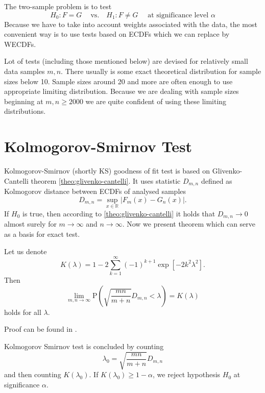 
The two-sample problem is to test
\begin{equation}
H_0: F = G \quad\: \text{vs.}\quad H_1: F \neq G \quad\text{ at significance level } \alpha
\end{equation} 
Because we have to take into account weights associated with the data, the most convenient way is to use tests based on ECDFs which we can replace by WECDFs. 

Lot of tests (including those mentioned below) are devised for relatively small data samples $m,n$. There usually is some exact theoretical distribution for sample sizes below 10. Sample sizes around 20 and more are often enough to use appropriate limiting distribution. Because we are dealing with sample sizes beginning at $m,n \geq 2000$ we are quite confident of using these limiting distributions.

\section{Kolmogorov-Smirnov Test}
Kolmogorov-Smirnov (shortly KS) goodness of fit test is based on Glivenko-Cantelli theorem \ref{theo:glivenko-cantelli}. It uses statistic $D_{m,n}$ defined as Kolmogorov distance between ECDFs of analysed samples
\begin{equation}
D_{m,n} = \sup_{x \in \mathbb{R}} |F_m(x) - G_n(x)|.
\end{equation}
If $H_0$ is true, then according to \ref{theo:glivenko-cantelli} it holds that $D_{m,n} \rightarrow 0$ almost surely for $m \rightarrow \infty$ and $n \rightarrow \infty$. Now we present theorem which can serve as a basis for exact test.

\begin{theorem}[Smirnov]
	Let us denote  
	\begin{equation}
	K(\lambda) = 1 - 2\sum_{k=1}^{\infty} (-1)^{k+1} \exp\left[ -2k^2\lambda^2\right].
	\end{equation}
	Then 
	\begin{equation}
	\lim_{m,n \rightarrow \infty} \mathrm{P}\left(\sqrt{\frac{mn}{m+n}}D_{m,n} < \lambda \right) = K(\lambda)
	\end{equation}
	holds for all $\lambda$.
\end{theorem}
\noindent Proof can be found in \cite{Smirnov1944}. 

\noindent Kolmogorov Smirnov test is concluded by counting 
\[\lambda_0 = \sqrt{\frac{mn}{m+n}}D_{m,n}\] and then counting $K\left( \lambda_0 \right)$. If $K\left( \lambda_0 \right) \geq 1 - \alpha$, we reject hypothesis $H_0$ at significance $\alpha$.

